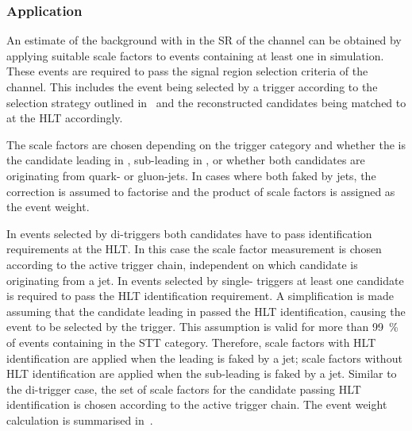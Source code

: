 \subsubsection{Application}

An estimate of the \ttbar background with \faketauhadvis in the SR of
the \hadhad channel can be obtained by applying suitable scale factors
to events containing at least one \faketauhadvis in \ttbar simulation.
These events are required to pass the signal region selection criteria
of the \hadhad channel. This includes the event being selected by a
trigger according to the selection strategy outlined
in~ and the reconstructed \tauhadvis candidates
being matched to \tauhadvis at the HLT accordingly.

The scale factors are chosen depending on the trigger category and
whether the \faketauhadvis is the \tauhadvis candidate leading in \pT,
sub-leading in \pT, or whether both candidates are originating from
quark- or gluon-jets. In cases where both \tauhadvis faked by jets,
the correction is assumed to factorise and the product of scale
factors is assigned as the event weight.

In events selected by di-\tauhadvis triggers both \tauhadvis
candidates have to pass identification requirements at the HLT. In
this case the scale factor measurement is chosen according to the
active trigger chain, independent on which \tauhadvis candidate is
originating from a jet. In events selected by single-\tauhadvis
triggers at least one \tauhadvis candidate is required to pass the
HLT \tauhadvis identification requirement. A simplification is made
assuming that the \tauhadvis candidate leading in \pT passed the HLT
\tauhadvis identification, causing the event to be selected by the
trigger. This assumption is valid for more than \SI{99}{\percent} of
\ttbar events containing \faketauhadvis in the STT
category. Therefore, scale factors with HLT identification are applied
when the leading \tauhadvis is faked by a jet; scale factors without
HLT identification are applied when the sub-leading \tauhadvis is faked
by a jet. Similar to the di-\tauhadvis trigger case, the set of scale
factors for the candidate passing HLT identification is chosen
according to the active trigger chain. The event weight calculation is
summarised in~.

